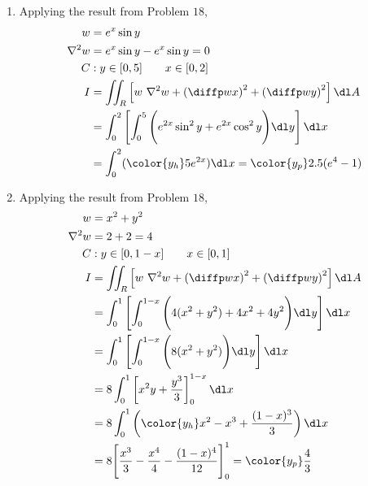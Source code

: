 \begin{enumerate}
    \item Applying the result from Problem $ 18 $,
          \begin{align}
              w          & = e^x \sin y                                                \\
              \nabla^2 w & = e^x \sin y - e^x \sin y = 0                               \\
              C          & : y \in [0, 5] \qquad x \in [0, 2]                          \\
              I          & = \iint_R \left[ w\ \nabla^2 w + \left( \diffp wx \right)^2
              + \left( \diffp wy \right)^2  \right] \dl A                              \\
                         & = \int_{0}^{2} \left[ \int_{0}^{5} \Bigg(
              e^{2x} \sin^2 y + e^{2x} \cos^2 y \Bigg) \dl y \right] \dl x             \\
                         & = \int_{0}^{2} ({\color{y_h} 5e^{2x}}) \dl x
              = \color{y_p} 2.5(e^4 - 1)
          \end{align}

    \item Applying the result from Problem $ 18 $,
          \begin{align}
              w          & = x^2 + y^2                                                 \\
              \nabla^2 w & = 2 + 2 = 4                                                 \\
              C          & : y \in [0, 1-x] \qquad x \in [0, 1]                        \\
              I          & = \iint_R \left[ w\ \nabla^2 w + \left( \diffp wx \right)^2
              + \left( \diffp wy \right)^2  \right] \dl A                              \\
                         & = \int_{0}^{1} \left[ \int_{0}^{1-x} \Bigg(
              4(x^2 + y^2) + 4x^2 + 4y^2 \Bigg) \dl y \right] \dl x                    \\
                         & = \int_{0}^{1} \left[ \int_{0}^{1-x} \Bigg(
              8(x^2 + y^2) \Bigg) \dl y \right] \dl x                                  \\
                         & = 8\int_{0}^{1} \left[ x^2y + \frac{y^3}{3}
              \right]_0^{1-x} \dl x                                                    \\
                         & = 8\int_{0}^{1} \left( {\color{y_h} x^2 - x^3 +
              \frac{(1-x)^3}{3}} \right) \dl x                                         \\
                         & = 8\Bigg[ \frac{x^3}{3} - \frac{x^4}{4}
                  - \frac{(1 - x)^4}{12} \Bigg]_0^1 =\color{y_p} \frac{4}{3}
          \end{align}
\end{enumerate}